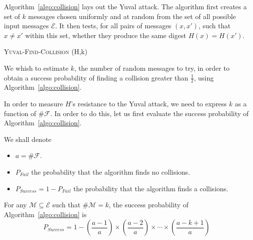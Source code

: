 Algorithm~\ref{algo:collision} lays out the Yuval attack. The algorithm first creates a set of $k$ messages chosen uniformly and at random from the set of all possible input messages  $\mathcal{E} $. It then tests, for all pairs of messages $(x,x')$, such that $x\ne x'$ within this set, whether they produce the same digest $H(x)=H(x')$.
\begin{algorithm}[H]
\caption{\textsc{Yuval-Find-Collision} (H,k)}
\label{algo:collision}
\begin{algorithmic}[1]
  \EndFor{}
  \Else{}
  \EndIf{}
 \end{algorithmic}
\end{algorithm}

We whish to estimate $k$, the number of random messages to try, in order to obtain a success probability of finding a collision greater than $\frac{1}{2}$, using Algorithm~\ref{algo:collision}.

In order to measure $H$'s resistance to the Yuval attack, we need to express $k$ as a function of $\#  \mathcal{F} $. In order to do this, let us first evaluate the success probability of Algorithm~\ref{algo:collision}.

We shall denote
\begin{itemize}
  \item $a = \#  \mathcal{F} $.
  \item $P_{Fail}$ the probability that the algorithm finds no collisions.
  \item $P_{Success}=1-P_{Fail}$ the probability that the algorithm finds a collisions.
\end{itemize}

\begin{thm}\label{th:2}
  For any $\mathcal{M}  \subseteq  \mathcal{E}$ such that $\# \mathcal{M} =k$, the success probability of Algorithm~\ref{algo:collision} is $$P_{Success}=1- (\frac{a - 1}{a}) \times (\frac{a - 2}{a}) \times \cdots \times (\frac{a - k + 1}{a}) $$
\end{thm}

